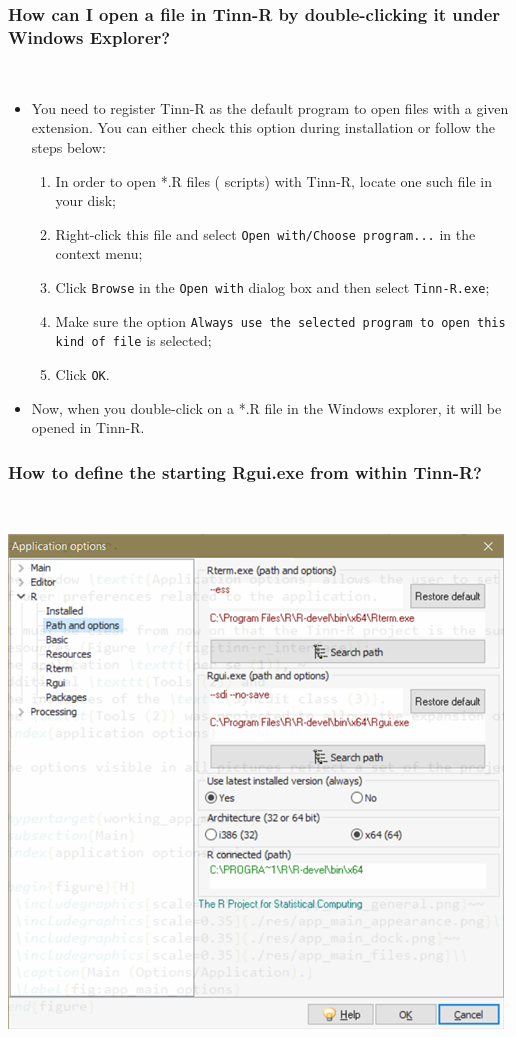 \subsubsection{How can I open a file in Tinn-R by double-clicking it under Windows Explorer?}\\

\begin{itemize}
  \item You need to register Tinn-R as the default program to open
    files with a given extension. You can either check this
    option during installation or follow the steps below:
    \begin{enumerate}
      \item In order to open *.R files (\RR{} scripts) with Tinn-R, locate
        one such file in your disk;
      \item Right-click this file and select \texttt{Open
          with/Choose program...} in the context menu;
      \item Click \texttt{Browse} in the \texttt{Open with} dialog
        box and then select \texttt{Tinn-R.exe};
      \item Make sure the option \texttt{Always use the selected
          program to open this kind of file} is selected;
      \item Click \texttt{OK}.
    \end{enumerate}
  \item Now, when you double-click on a *.R file in the Windows
    explorer, it will be opened in Tinn-R.
\end{itemize}


\subsubsection{How to define the starting Rgui.exe from within Tinn-R?}\\

\includegraphics[scale=1]{./res/app_r_pathandoptions.png}

